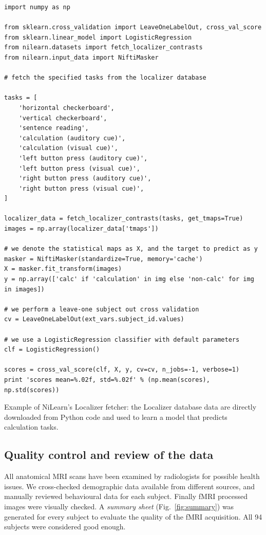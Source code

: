 \documentclass[review]{elsarticle}
\begin{document}
\begin{listing}[H]
\begin{verbatim}
import numpy as np

from sklearn.cross_validation import LeaveOneLabelOut, cross_val_score
from sklearn.linear_model import LogisticRegression
from nilearn.datasets import fetch_localizer_contrasts
from nilearn.input_data import NiftiMasker

# fetch the specified tasks from the localizer database

tasks = [
    'horizontal checkerboard',
    'vertical checkerboard',
    'sentence reading',
    'calculation (auditory cue)',
    'calculation (visual cue)',
    'left button press (auditory cue)',
    'left button press (visual cue)',
    'right button press (auditory cue)',
    'right button press (visual cue)',
]

localizer_data = fetch_localizer_contrasts(tasks, get_tmaps=True)
images = np.array(localizer_data['tmaps'])

# we denote the statistical maps as X, and the target to predict as y
masker = NiftiMasker(standardize=True, memory='cache')
X = masker.fit_transform(images)
y = np.array(['calc' if 'calculation' in img else 'non-calc' for img in images])

# we perform a leave-one subject out cross validation
cv = LeaveOneLabelOut(ext_vars.subject_id.values)

# we use a LogisticRegression classifier with default parameters
clf = LogisticRegression()

scores = cross_val_score(clf, X, y, cv=cv, n_jobs=-1, verbose=1)
print 'scores mean=%.02f, std=%.02f' % (np.mean(scores), np.std(scores))
\end{verbatim}
\caption{Example of NiLearn's Localizer fetcher: the Localizer database data are directly downloaded from Python code and used to learn a model that predicts calculation tasks.}
\label{code:NiLearn}
\end{listing}


\subsection{Quality control and review of the data}

All anatomical MRI scans have been examined by radiologists for possible health issues. We cross-checked demographic data available from different sources, and manually reviewed behavioural data for each subject. Finally fMRI processed images were visually checked. A \emph{summary sheet} (Fig.~\ref{fig:summary}) was generated for every subject to evaluate the quality of the fMRI acquisition. All 94 subjects were considered good enough.
\end{document}

